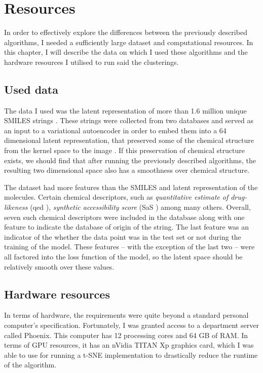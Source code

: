 \chapter{Resources}\label{ch:resources}

In order to effectively explore the differences between the previously described algorithms, I needed a sufficiently large dataset and computational resources. In this chapter, I will describe the data on which I used these algorithms and the hardware resources I utilised to run said the clusterings.

\section{Used data}

The data I used was the latent representation of more than 1.6 million unique SMILES strings \cite{bib:smiles}. These strings were collected from two databases and served as an input to a variational autoencoder in order to embed them into a 64 dimensional latent representation, that preserved some of the chemical structure from the kernel space to the image \cite{bib:thesis}. If this preservation of chemical structure exists, we should find that after running the previously described algorithms, the resulting two dimensional space also has a smoothness over chemical structure.

The dataset had more features than the SMILES and latent representation of the molecules. Certain chemical descriptors, such as \textit{quantitative estimate of drug-likeness} (qed \cite{bib:qed}), \textit{synthetic accessibility score} (SaS \cite{bib:sas}) among many others. Overall, seven such chemical descriptors were included in the database along with one feature to indicate the database of origin of the string. The last feature was an indicator of the whether the data point was in the test set or not during the training of the model. These features -- with the exception of the last two -- were all factored into the loss function of the model, so the latent space should be relatively smooth over these values.

\section{Hardware resources}

In terms of hardware, the requirements were quite beyond a standard personal computer's specification. Fortunately, I was granted access to a department server called Phoenix. This computer has 12 processing cores and 64 GB of RAM. In terms of GPU resources, it has an nVidia TITAN Xp graphics card, which I was able to use for running a t-SNE implementation to drastically reduce the runtime of the algorithm.

